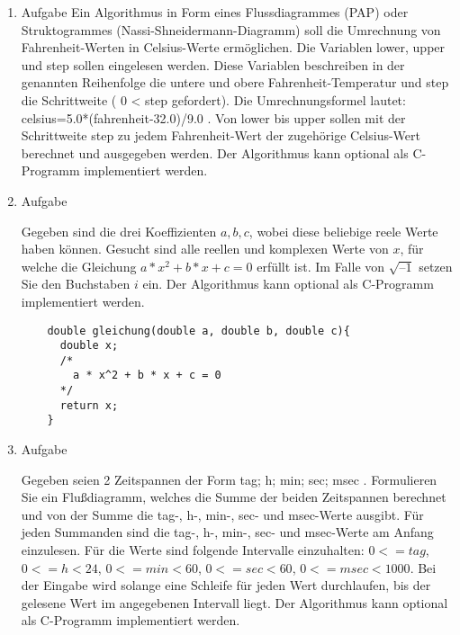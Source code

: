 \documentclass[12pt,a4paper]{scrreprt}
\begin{document}
\begin{enumerate}
\item Aufgabe %
Ein Algorithmus in Form eines Flussdiagrammes (PAP) oder Struktogrammes (Nassi-Shneidermann-Diagramm) soll die Umrechnung von Fahrenheit-Werten in Celsius-Werte ermöglichen. Die Variablen lower, upper und step sollen eingelesen werden. Diese Variablen beschreiben in der genannten Reihenfolge die untere und obere Fahrenheit-Temperatur und step die Schrittweite ( 0 < step gefordert). Die Umrechnungsformel lautet: celsius=5.0*(fahrenheit-32.0)/9.0 .
Von lower bis upper sollen mit der Schrittweite step zu jedem Fahrenheit-Wert der zugehörige Celsius-Wert berechnet und ausgegeben werden. Der Algorithmus kann optional als C-Programm implementiert werden.

\begin{comment}
    (1)_Start
    (2)_Input:lower 
    (1)->(2)
    (3)_Input:upper
    (2)->(3)
    (4)_Input:step 
    (3)->(4)
    (6)_Output:(lower-32.0)/1.8  //ungekürzt: 5.0*(fahrenheit-32.0)/9.0
    (4)->(5)
    (5)_If(0 < step)?(5)->(6)
    (5)->(4)
    (7)_Set:lower+=step
    (6)->(7)
    (9)_End
    (8)_If(lower < upper)?(8)->(6)
    (8)->(9)
\end{comment}

\item Aufgabe %

Gegeben sind die drei Koeffizienten $ a, b, c$, wobei diese beliebige reele Werte haben können. Gesucht sind alle reellen und komplexen Werte von $ x $, für welche die Gleichung $ a * x^2 + b * x + c = 0 $ erfüllt ist. Im Falle von $ \sqrt{–1} $ setzen Sie den Buchstaben $ i $ ein.
Der Algorithmus kann optional als C-Programm implementiert werden.

\begin{lstlisting}
    double gleichung(double a, double b, double c){
      double x;
      /*
        a * x^2 + b * x + c = 0
      */
      return x;
    }
\end{lstlisting}

\item Aufgabe %

Gegeben seien 2 Zeitspannen der Form tag; h; min; sec; msec . Formulieren Sie ein Flußdiagramm, welches die Summe der beiden Zeitspannen berechnet und von der Summe die tag-, h-, min-, sec- und msec-Werte ausgibt. Für jeden Summanden sind die tag-, h-, min-, sec- und msec-Werte am Anfang einzulesen. Für die Werte sind folgende Intervalle einzuhalten: $ 0<=tag$, $ 0 <= h<24$, $ 0<= min < 60 $, $ 0<= sec < 60$, $ 0<= msec < 1000$. Bei der Eingabe wird solange eine Schleife für jeden Wert durchlaufen, bis der gelesene Wert im angegebenen Intervall liegt. Der Algorithmus kann optional als C-Programm implementiert werden.


\end{enumerate}
\end{document}
